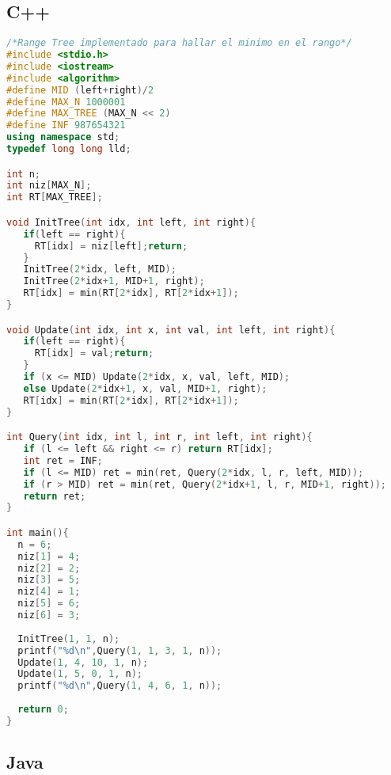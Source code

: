 \subsection{C++}

\begin{lstlisting}[language=C++]
/*Range Tree implementado para hallar el minimo en el rango*/	
#include <stdio.h>
#include <iostream>
#include <algorithm>
#define MID (left+right)/2
#define MAX_N 1000001
#define MAX_TREE (MAX_N << 2)
#define INF 987654321
using namespace std;
typedef long long lld;

int n;
int niz[MAX_N];
int RT[MAX_TREE];

void InitTree(int idx, int left, int right){
   if(left == right){
     RT[idx] = niz[left];return;
   }
   InitTree(2*idx, left, MID);
   InitTree(2*idx+1, MID+1, right);
   RT[idx] = min(RT[2*idx], RT[2*idx+1]);
}

void Update(int idx, int x, int val, int left, int right){
   if(left == right){
     RT[idx] = val;return;
   }
   if (x <= MID) Update(2*idx, x, val, left, MID);
   else Update(2*idx+1, x, val, MID+1, right);
   RT[idx] = min(RT[2*idx], RT[2*idx+1]);
}

int Query(int idx, int l, int r, int left, int right){
   if (l <= left && right <= r) return RT[idx];
   int ret = INF;
   if (l <= MID) ret = min(ret, Query(2*idx, l, r, left, MID));
   if (r > MID) ret = min(ret, Query(2*idx+1, l, r, MID+1, right));
   return ret;
}

int main(){
  n = 6;
  niz[1] = 4;
  niz[2] = 2;
  niz[3] = 5;
  niz[4] = 1;
  niz[5] = 6;
  niz[6] = 3;
	
  InitTree(1, 1, n);
  printf("%d\n",Query(1, 1, 3, 1, n));
  Update(1, 4, 10, 1, n);
  Update(1, 5, 0, 1, n);
  printf("%d\n",Query(1, 4, 6, 1, n));
	
  return 0;
}	
\end{lstlisting}


\subsection{Java}

